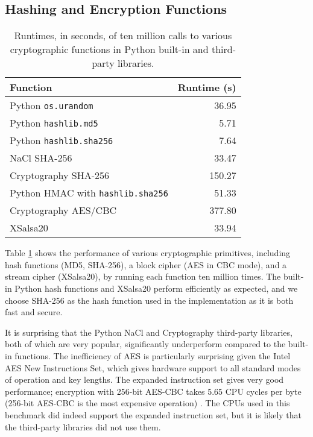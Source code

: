 \subsection{Hashing and Encryption Functions} \label{perf:crypto:hashenc}

\begin{table}[htbp]
\centering
\begin{tabular}{l | r}
  \textbf{Function} & \textbf{Runtime (s)} \\
  \hline
  Python \texttt{os.urandom} & 36.95 \\
  Python \texttt{hashlib.md5} & 5.71 \\
  Python \texttt{hashlib.sha256} & 7.64 \\
  NaCl SHA-256 & 33.47 \\
  Cryptography SHA-256 & 150.27 \\
  Python HMAC with \texttt{hashlib.sha256} & 51.33 \\
  Cryptography AES/CBC & 377.80 \\
  XSalsa20 & 33.94
\end{tabular}
\caption[Performance measurements of cryptographic primitives]{Runtimes, in seconds, of ten million calls to various cryptographic functions in Python built-in and third-party libraries.}
\label{table:perf:crypto}
\end{table}

Table \ref{table:perf:crypto} shows the performance of various cryptographic primitives, including hash functions (MD5, SHA-256), a block cipher (AES in CBC mode), and a stream cipher (XSalsa20), by running each function ten million times. The built-in Python hash functions and XSalsa20 perform efficiently as expected, and we choose SHA-256 as the hash function used in the implementation as it is both fast and secure.

It is surprising that the Python NaCl and Cryptography third-party libraries, both of which are very popular, significantly underperform compared to the built-in functions. The inefficiency of AES is particularly surprising given the Intel AES New Instructions Set, which gives hardware support to all standard modes of operation and key lengths. The expanded instruction set gives very good performance; encryption with 256-bit AES-CBC takes 5.65 CPU cycles per byte (256-bit AES-CBC is the most expensive operation) \cite{intel}. The CPUs used in this benchmark did indeed support the expanded instruction set, but it is likely that the third-party libraries did not use them.

